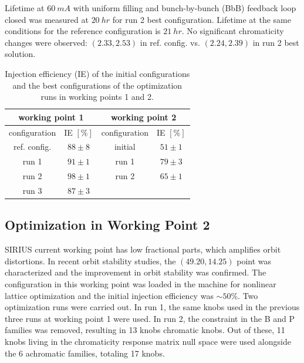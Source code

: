 \documentclass[a4paper,
               keeplastbox,   %
               ]{jacow}
\begin{document}
Lifetime at $60~\unit{mA}$ with uniform filling and bunch-by-bunch (BbB) feedback loop closed was measured at $20~\unit{hr}$ for run 2 best configuration. Lifetime at the same conditions for the reference configuration is $21~\unit{hr}$. No significant chromaticity changes were observed: $(2.33, 2.53)$ in ref. config. vs. $(2.24, 2.39)$ in run 2 best solution.  
\begin{table}[!h]
\centering
\caption{Injection efficiency (IE) of the initial configurations and the best configurations of the optimization runs in working points 1 and 2.} 
\begin{tabular}{cccc}
\toprule
\multicolumn{2}{c}{working point 1}         & \multicolumn{2}{c}{working point 2}                \\ \midrule
configuration & IE $[\%]$ & configuration        & IE $[\%]$ \\ \hline
ref. config.  & $88\pm8$                & initial              & $51\pm1$                \\
run 1         & $91\pm1$                & run 1                & $79\pm3$                \\
run 2         & $98\pm1$                & run 2                & $65\pm1    $                \\
run 3         & $87\pm3$                & \multicolumn{1}{l}{} & \multicolumn{1}{l}{}        \\ \hline
\end{tabular}

\label{table1}
\end{table}


\subsection{Optimization in Working Point 2}
 SIRIUS current working point has low fractional parts, which amplifies orbit distortions. In recent orbit stability studies, the $(49.20, 14.25)$ point was characterized and the improvement in orbit stability was confirmed. The configuration in this working point was loaded in the machine for nonlinear lattice optimization and the initial injection efficiency was $\sim50\%$. Two optimization runs were carried out. In run 1, the same knobs used in the previous three runs at working point 1 were used. In run 2, the constraint in the B and P families was removed, resulting in 13 knobs chromatic knobs. Out of these, 11 knobs living in the chromaticity response matrix null space were used alongside the 6 achromatic families, totaling 17 knobs. 
 
\end{document}
